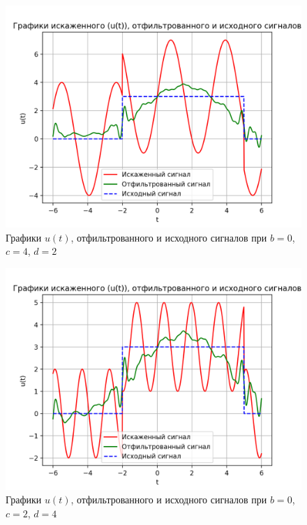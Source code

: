 \begin{figure}[ht!]
    \centering
    \includegraphics[scale=0.85]{media/1 task/specific_freq/Cleaned_0_4_2_-0,805:-0,156.png}
    \caption{Графики  $u(t)$, отфильтрованного и исходного сигналов при $b=0$,  $c=4$,  $d=2$}
    \label{fig:cleaned_0_4_2}
\end{figure}

\clearpage

\begin{figure}[ht!]
    \centering
    \includegraphics[scale=0.85]{media/1 task/specific_freq/Cleaned_0_2_4_-0,805:-0,156.png}
    \caption{Графики  $u(t)$, отфильтрованного и исходного сигналов при $b=0$,  $c=2$,  $d=4$}
    \label{fig:cleaned_0_2_4}
\end{figure}

